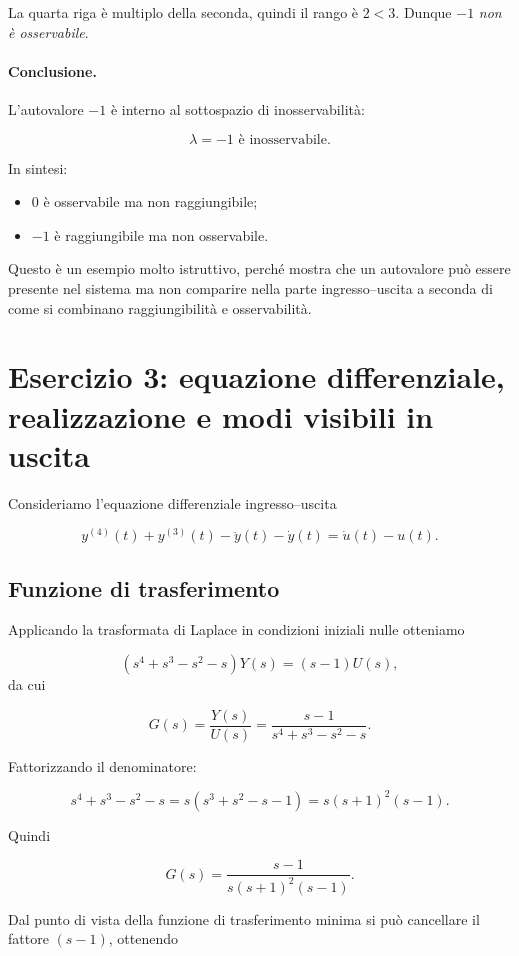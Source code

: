 La quarta riga è multiplo della seconda, quindi il rango è \(2<3\). Dunque \(-1\) \emph{non è osservabile}.

\paragraph{Conclusione.}
L'autovalore \(-1\) è interno al sottospazio di inosservabilità:

\[
\boxed{\lambda=-1 \text{ è inosservabile}.}
\]

In sintesi:
\begin{itemize}
    \item \(0\) è osservabile ma non raggiungibile;
    \item \(-1\) è raggiungibile ma non osservabile.
\end{itemize}

Questo è un esempio molto istruttivo, perché mostra che un autovalore può essere presente nel sistema ma non comparire nella parte ingresso--uscita a seconda di come si combinano raggiungibilità e osservabilità.

\bigskip

\section{Esercizio 3: equazione differenziale, realizzazione e modi visibili in uscita}

Consideriamo l'equazione differenziale ingresso--uscita

\[
y^{(4)}(t)+y^{(3)}(t)-\ddot y(t)-\dot y(t)=\dot u(t)-u(t).
\]

\subsection{Funzione di trasferimento}

Applicando la trasformata di Laplace in condizioni iniziali nulle otteniamo

\[
\left(s^4+s^3-s^2-s\right)Y(s)=(s-1)U(s),
\]
da cui

\[
G(s)=\frac{Y(s)}{U(s)}=
\frac{s-1}{s^4+s^3-s^2-s}.
\]

Fattorizzando il denominatore:

\[
s^4+s^3-s^2-s
=
s(s^3+s^2-s-1)
=
s(s+1)^2(s-1).
\]

Quindi

\[
G(s)=\frac{s-1}{s(s+1)^2(s-1)}.
\]

Dal punto di vista della funzione di trasferimento minima si può cancellare il fattore \((s-1)\), ottenendo

